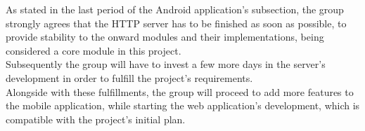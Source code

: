     As stated in the last period of the Android application's subsection, the group strongly agrees that the HTTP server has to be finished
    as soon as possible, to provide stability to the onward modules and their implementations, being considered a core module in this project.\\

    Subsequently the group will have to invest a few more days in the server's development in order to fulfill the project's requirements.\\

    Alongside with these fulfillments, the group will proceed to add more features to the mobile application, while starting the web application's development,
    which is compatible with the project's initial plan.